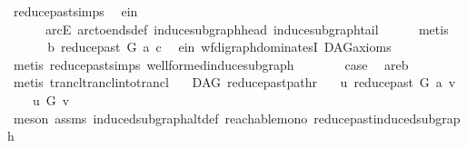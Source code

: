 \begin{isabellebody}
\ reduce{\isacharunderscore}{\kern0pt}past{\isachardot}{\kern0pt}simps\ \isamarkupfalse%
\ e{\isacharunderscore}{\kern0pt}in\isanewline
\ \ \ \ \ \ arcE\ arc{\isacharunderscore}{\kern0pt}to{\isacharunderscore}{\kern0pt}ends{\isacharunderscore}{\kern0pt}def\ induce{\isacharunderscore}{\kern0pt}subgraph{\isacharunderscore}{\kern0pt}head\ induce{\isacharunderscore}{\kern0pt}subgraph{\isacharunderscore}{\kern0pt}tail\isanewline
\ \ \ \ \isamarkupfalse%
\ metis\ \ \isanewline
\ \ \isamarkupfalse%
\ \isamarkupfalse%
\ \ {\isachardoublequoteopen}b\ {\isasymrightarrow}\isactrlbsub reduce{\isacharunderscore}{\kern0pt}past\ G\ a\isactrlesub \ c{\isachardoublequoteclose}\ \isamarkupfalse%
\ e{\isacharunderscore}{\kern0pt}in{}\ wf{\isacharunderscore}{\kern0pt}digraph{\isachardot}{\kern0pt}dominatesI\ DAG{\isacharunderscore}{\kern0pt}axioms\isanewline
\ \ \ \ \isamarkupfalse%
\ {\isacharparenleft}{\kern0pt}metis\ reduce{\isacharunderscore}{\kern0pt}past{\isachardot}{\kern0pt}simps\ wellformed{\isacharunderscore}{\kern0pt}induce{\isacharunderscore}{\kern0pt}subgraph{\isacharparenright}{\kern0pt}\ \ \isanewline
\ \ \isamarkupfalse%
\ \isamarkupfalse%
\ {\isacharquery}{\kern0pt}case\ \isamarkupfalse%
\ a{}{\isacharunderscore}{\kern0pt}re{\isacharunderscore}{\kern0pt}b\isanewline
\ \ \ \ \isamarkupfalse%
\ {\isacharparenleft}{\kern0pt}metis\ trancl{\isachardot}{\kern0pt}trancl{\isacharunderscore}{\kern0pt}into{\isacharunderscore}{\kern0pt}trancl{\isacharparenright}{\kern0pt}\ \isanewline
{}\isamarkupfalse%
%
\endisatagproof
{\isafoldproof}%
%
\isadelimproof
\isanewline
%
\endisadelimproof
\isanewline
\isanewline
\isanewline
{}\isamarkupfalse%
\ {\isacharparenleft}{\kern0pt}\ DAG{\isacharparenright}{\kern0pt}\ reduce{\isacharunderscore}{\kern0pt}past{\isacharunderscore}{\kern0pt}pathr{\isacharcolon}{\kern0pt}\isanewline
\ \ \ {\isachardoublequoteopen}u\ {\isasymrightarrow}\isactrlsup {\isacharasterisk}{\kern0pt}\isactrlbsub reduce{\isacharunderscore}{\kern0pt}past\ G\ a\isactrlesub \ v{\isachardoublequoteclose}\ \isanewline
\ \ \ {\isachardoublequoteopen}\ u\ {\isasymrightarrow}\isactrlsup {\isacharasterisk}{\kern0pt}\isactrlbsub G\isactrlesub \ v{\isachardoublequoteclose}\isanewline
%
\isadelimproof
\ \ %
\endisadelimproof
%
\isatagproof
{}\isamarkupfalse%
\ {\isacharparenleft}{\kern0pt}meson\ assms\ induced{\isacharunderscore}{\kern0pt}subgraph{\isacharunderscore}{\kern0pt}altdef\ reachable{\isacharunderscore}{\kern0pt}mono\ reduce{\isacharunderscore}{\kern0pt}past{\isacharunderscore}{\kern0pt}induced{\isacharunderscore}{\kern0pt}subgraph{\isacharparenright}{\kern0pt}%

\end{isabellebody}
